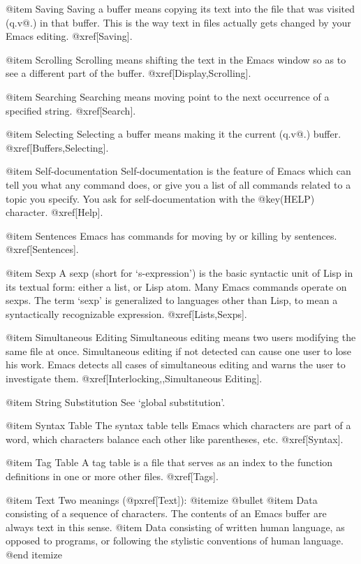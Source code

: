 @item Saving
Saving a buffer means copying its text into the file that was visited
(q.v@.) in that buffer.  This is the way text in files actually gets
changed by your Emacs editing.  @xref[Saving].

@item Scrolling
Scrolling means shifting the text in the Emacs window so as to see a
different part of the buffer.  @xref[Display,Scrolling].

@item Searching
Searching means moving point to the next occurrence of a specified string.
@xref[Search].

@item Selecting
Selecting a buffer means making it the current (q.v@.) buffer.
@xref[Buffers,Selecting].

@item Self-documentation
Self-documentation is the feature of Emacs which can tell you what any
command does, or give you a list of all commands related to a topic you
specify.  You ask for self-documentation with the @key(HELP) character.
@xref[Help].

@item Sentences
Emacs has commands for moving by or killing by sentences.
@xref[Sentences].

@item Sexp
A sexp (short for `s-expression') is the basic syntactic unit of Lisp in
its textual form: either a list, or Lisp atom.  Many Emacs commands operate
on sexps.  The term `sexp' is generalized to languages other than Lisp,
to mean a syntactically recognizable expression.
@xref[Lists,Sexps].

@item Simultaneous Editing
Simultaneous editing means two users modifying the same file at once.
Simultaneous editing if not detected can cause one user to lose his work.
Emacs detects all cases of simultaneous editing and warns the user to
investigate them.  @xref[Interlocking,,Simultaneous Editing].

@item String Substitution
See `global substitution'.

@item Syntax Table
The syntax table tells Emacs which characters are part of a word, which
characters balance each other like parentheses, etc.  @xref[Syntax].

@item Tag Table
A tag table is a file that serves as an index to the function
definitions in one or more other files.  @xref[Tags].

@item Text
Two meanings (@pxref[Text]):
@itemize @bullet
@item
Data consisting of a sequence of characters.  The contents of an
Emacs buffer are always text in this sense.
@item
Data consisting of written human language, as opposed to programs, or
following the stylistic conventions of human language.
@end itemize

